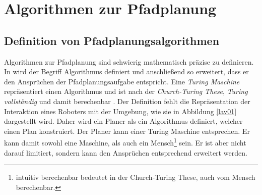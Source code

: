 

\chapter{Algorithmen zur Pfadplanung}
\section{Definition von Pfadplanungsalgorithmen}
 

Algorithmen zur Pfadplanung sind schwierig mathematisch präzise zu definieren.
In \cite[~S. 19]{Lav06} wird der Begriff Algorithmus definiert und anschließend so erweitert, dass er den Ansprüchen der Pfadplanungsaufgabe entspricht. 
Eine \textit{Turing Maschine} repräsentiert einen Algorithmus und ist nach der \textit{Church-Turing These}, \textit{Turing vollständig} und damit berechenbar \cite{Schmitz:19}. 
Der Definition fehlt die Repräsentation der Interaktion eines Roboters mit der Umgebung, wie sie in Abbildung \ref{lav01} dargestellt wird. 
Daher wird ein Planer als ein Algorithmus definiert, welcher einen Plan konstruiert. 
Der Planer kann einer Turing Maschine entsprechen. 
Er kann damit sowohl eine Maschine, als auch ein Mensch\footnote{intuitiv berechenbar bedeutet in der Church-Turing These, auch vom Mensch berechenbar.} sein.
Er ist aber nicht darauf limitiert, sondern kann den Ansprüchen entsprechend erweitert werden.\cite[~S. 20]{Lav06}

